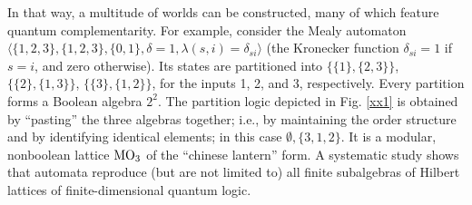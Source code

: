 In that way, a multitude of worlds can be constructed,
many of which feature quantum complementarity.
For example, consider the Mealy automaton
$\langle \{1,2,3\},\{1,2,3\},\{0,1\},\delta = 1 ,\lambda(s,i)=\delta_{si} \rangle$
(the Kronecker function $\delta_{si}=1$ if $s=i$, and zero otherwise).
Its states
are partitioned into
$
\{\{1\},\{2,3\}\}
$,
$
\{\{2\},\{1,3\}\}
$,
$
\{\{3\},\{1,2\}\}
$, for the inputs 1, 2, and 3, respectively.
Every partition forms a Boolean algebra $2^2$.
The partition logic depicted in Fig. \ref{xx1}
is obtained by ``pasting'' the three algebras together; i.e., by maintaining the order structure and by
identifying
identical elements; in this case $\emptyset,\{3,1,2\}$.
It is a modular, nonboolean lattice  ${\rm MO}_3$ of the ``chinese lantern'' form.
A systematic study \cite[pp.~38-39]{svozil-ql}
shows that automata reproduce (but are not limited to)
all finite subalgebras of Hilbert lattices of finite-dimensional quantum logic.
